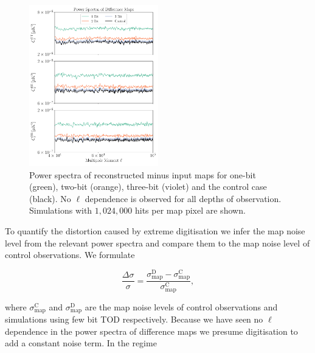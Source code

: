 \documentclass[apj]{emulateapj}
\begin{document}

\begin{figure}[htb]\centering
\includegraphics[width=0.5\textwidth,clip]{Plots/diffwn.pdf}
  \caption[Current ]{
  Power spectra of reconstructed minus input maps for one-bit (green), two-bit (orange), three-bit (violet) and the control case (black). No $\ell$ dependence is observed for all depths of observation. Simulations with $1,024,000$ hits per map pixel are shown.
\label{fig:diffpswn}
}
\end{figure}

To quantify the distortion caused by extreme digitisation we infer the map noise level from the relevant power spectra and compare them to the map noise level of control observations. We formulate

\begin{equation} \label{eq:extramapnoise}
\frac{\Delta \sigma}{\sigma} = \frac{\sigma_{\mathrm{map}}^{\mathrm{D}}-\sigma_{\mathrm{map}}^{\mathrm{C}}}{\sigma_{\mathrm{map}}^{\mathrm{C}}},
\end{equation}

where $\sigma_{\mathrm{map}}^{\mathrm{C}}$ and $\sigma_{\mathrm{map}}^{\mathrm{D}}$ are the map noise levels of control observations and simulations using few bit TOD respectively. Because we have seen no $\ell$ dependence in the power spectra of difference maps we presume digitisation to add a constant noise term. In the regime
\end{document}
